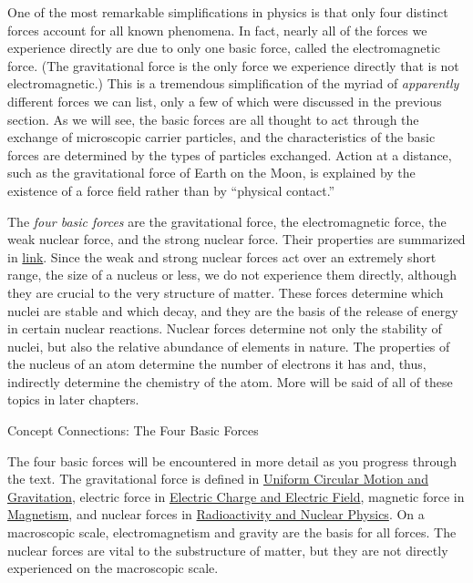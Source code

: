 \documentclass[
]{book}
\newenvironment{note}{}{}
\begin{document}
One of the most remarkable simplifications in physics is that only four
distinct forces account for all known phenomena. In fact, nearly all of
the forces we experience directly are due to only one basic force,
called the electromagnetic force. (The gravitational force is the only
force we experience directly that is not electromagnetic.) This is a
tremendous simplification of the myriad of \emph{apparently} different forces
we can list, only a few of which were discussed in the previous section.
As we will see, the basic forces are all thought to act through the
exchange of microscopic carrier particles, and the characteristics of
the basic forces are determined by the types of particles exchanged.
Action at a distance, such as the gravitational force of Earth on the
Moon, is explained by the existence of a \protect\hypertarget{import-auto-id2990636}{}{force
field} rather than by ``physical
contact.''

The \emph{four basic forces} are the gravitational force, the electromagnetic
force, the weak nuclear force, and the strong nuclear force. Their
properties are summarized in
\protect\hyperlink{import-auto-id1588108}{link}. Since the weak
and strong nuclear forces act over an extremely short range, the size of
a nucleus or less, we do not experience them directly, although they are
crucial to the very structure of matter. These forces determine which
nuclei are stable and which decay, and they are the basis of the release
of energy in certain nuclear reactions. Nuclear forces determine not
only the stability of nuclei, but also the relative abundance of
elements in nature. The properties of the nucleus of an atom determine
the number of electrons it has and, thus, indirectly determine the
chemistry of the atom. More will be said of all of these topics in later
chapters.

\hypertarget{fs-id3025368}{}
\begin{note}

Concept Connections: The Four Basic Forces

The four basic forces will be encountered in more detail as you progress
through the text. The gravitational force is defined in \href{/m54986}{Uniform
Circular Motion and Gravitation}, electric force in \href{/m55297}{Electric
Charge and Electric Field}, magnetic force in
\href{/m55372}{Magnetism}, and nuclear forces in \href{/m54935}{Radioactivity and Nuclear
Physics}. On a macroscopic scale, electromagnetism and gravity
are the basis for all forces. The nuclear forces are vital to the
substructure of matter, but they are not directly experienced on the
macroscopic scale.

\end{note}
\end{document}
